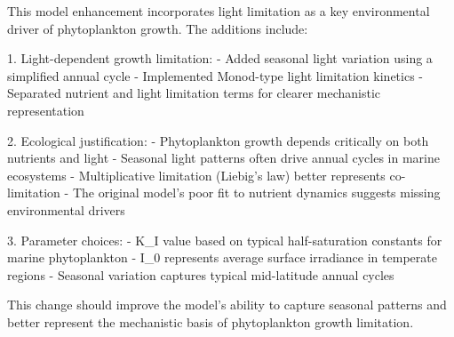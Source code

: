 This model enhancement incorporates light limitation as a key environmental driver of phytoplankton growth. The additions include:

1. Light-dependent growth limitation:
   - Added seasonal light variation using a simplified annual cycle
   - Implemented Monod-type light limitation kinetics
   - Separated nutrient and light limitation terms for clearer mechanistic representation

2. Ecological justification:
   - Phytoplankton growth depends critically on both nutrients and light
   - Seasonal light patterns often drive annual cycles in marine ecosystems
   - Multiplicative limitation (Liebig's law) better represents co-limitation
   - The original model's poor fit to nutrient dynamics suggests missing environmental drivers

3. Parameter choices:
   - K_I value based on typical half-saturation constants for marine phytoplankton
   - I_0 represents average surface irradiance in temperate regions
   - Seasonal variation captures typical mid-latitude annual cycles

This change should improve the model's ability to capture seasonal patterns and better represent the mechanistic basis of phytoplankton growth limitation.
